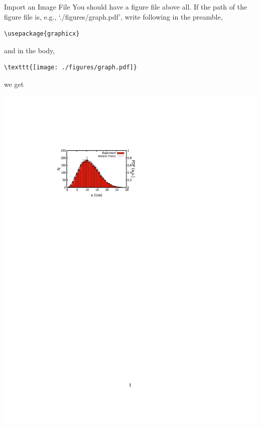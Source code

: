 \documentclass[12pt]{gshs_lecture}
\begin{document}
\begin{frame}[t,fragile]{Import an Image File}\small
You should have a figure file above all. If the path of the figure file is, e.g., `./figures/graph.pdf', write following in the preamble,
\begin{block}{}
\begin{lstlisting}
\usepackage{graphicx}
\end{lstlisting}
\end{block}
and in the body,
\begin{block}{}
\begin{lstlisting}
\texttt{[image: ./figures/graph.pdf]}
\end{lstlisting}
\end{block}
we get
\begin{center}
\begin{framed}
\includegraphics[width=\textwidth,trim={0cm 20cm 0cm 4cm},clip]{./test_article/article013.pdf}
\end{framed}
\end{center}
\end{frame}
\end{document}
